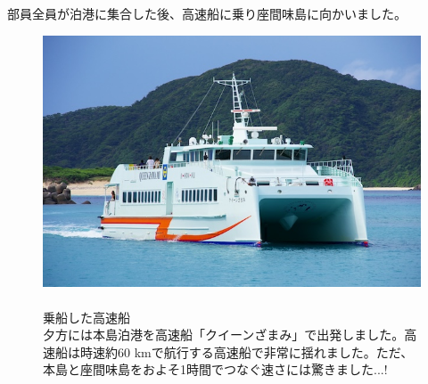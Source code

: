 \documentclass[../main]{subfiles}
\begin{document}
部員全員が泊港に集合した後、高速船に乗り座間味島に向かいました。
\begin{figure}[H]
  \begin{minipage}[b]{0.48\columnwidth}
    \centering
    \includegraphics[width=\columnwidth]{figure/queen_zamami.jpg}
  \end{minipage}
  \hspace{0.04\columnwidth} %
  \begin{minipage}[b]{0.48\columnwidth}
    \caption{\\
    乗船した高速船\\
    夕方には本島泊港を高速船「クイーンざまみ」で出発しました。高速船は時速約60 kmで航行する高速船で非常に揺れました。ただ、本島と座間味島をおよそ1時間でつなぐ速さには驚きました...!
    }
  \end{minipage}
\end{figure}
\end{document}
